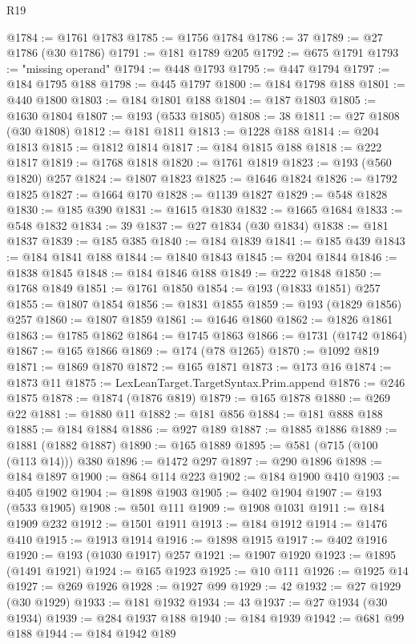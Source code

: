 \begin{lexlean}{R19}
\begin{coremodule}
@1784 := @1761 @1783
@1785 := @1756 @1784
@1786 := 37
@1789 := @27 @1786 (@30 @1786)
@1791 := @181 @1789 @205
@1792 := @675 @1791
@1793 := "missing operand"
@1794 := @448 @1793
@1795 := @447 @1794
@1797 := @184 @1795 @188
@1798 := @445 @1797
@1800 := @184 @1798 @188
@1801 := @440 @1800
@1803 := @184 @1801 @188
@1804 := @187 @1803
@1805 := @1630 @1804
@1807 := @193 (@533 @1805)
@1808 := 38
@1811 := @27 @1808 (@30 @1808)
@1812 := @181 @1811
@1813 := @1228 @188
@1814 := @204 @1813
@1815 := @1812 @1814
@1817 := @184 @1815 @188
@1818 := @222 @1817
@1819 := @1768 @1818
@1820 := @1761 @1819
@1823 := @193 (@560 @1820) @257
@1824 := @1807 @1823
@1825 := @1646 @1824
@1826 := @1792 @1825
@1827 := @1664 @170
@1828 := @1139 @1827
@1829 := @548 @1828
@1830 := @185 @390
@1831 := @1615 @1830
@1832 := @1665 @1684
@1833 := @548 @1832
@1834 := 39
@1837 := @27 @1834 (@30 @1834)
@1838 := @181 @1837
@1839 := @185 @385
@1840 := @184 @1839
@1841 := @185 @439
@1843 := @184 @1841 @188
@1844 := @1840 @1843
@1845 := @204 @1844
@1846 := @1838 @1845
@1848 := @184 @1846 @188
@1849 := @222 @1848
@1850 := @1768 @1849
@1851 := @1761 @1850
@1854 := @193 (@1833 @1851) @257
@1855 := @1807 @1854
@1856 := @1831 @1855
@1859 := @193 (@1829 @1856) @257
@1860 := @1807 @1859
@1861 := @1646 @1860
@1862 := @1826 @1861
@1863 := @1785 @1862
@1864 := @1745 @1863
@1866 := @1731 (@1742 @1864)
@1867 := @165 @1866
@1869 := @174 (@78 @1265)
@1870 := @1092 @819
@1871 := @1869 @1870
@1872 := @165 @1871
@1873 := @173 @16
@1874 := @1873 @11
@1875 := LexLeanTarget.TargetSyntax.Prim.append
@1876 := @246 @1875
@1878 := @1874 (@1876 @819)
@1879 := @165 @1878
@1880 := @269 @22
@1881 := @1880 @11
@1882 := @181 @856
@1884 := @181 @888 @188
@1885 := @184 @1884
@1886 := @927 @189
@1887 := @1885 @1886
@1889 := @1881 (@1882 @1887)
@1890 := @165 @1889
@1895 := @581 (@715 (@100 (@113 @14))) @380
@1896 := @1472 @297
@1897 := @290 @1896
@1898 := @184 @1897
@1900 := @864 @114 @223
@1902 := @184 @1900 @410
@1903 := @405 @1902
@1904 := @1898 @1903
@1905 := @402 @1904
@1907 := @193 (@533 @1905)
@1908 := @501 @111
@1909 := @1908 @1031
@1911 := @184 @1909 @232
@1912 := @1501 @1911
@1913 := @184 @1912
@1914 := @1476 @410
@1915 := @1913 @1914
@1916 := @1898 @1915
@1917 := @402 @1916
@1920 := @193 (@1030 @1917) @257
@1921 := @1907 @1920
@1923 := @1895 (@1491 @1921)
@1924 := @165 @1923
@1925 := @10 @111
@1926 := @1925 @14
@1927 := @269 @1926
@1928 := @1927 @99
@1929 := 42
@1932 := @27 @1929 (@30 @1929)
@1933 := @181 @1932
@1934 := 43
@1937 := @27 @1934 (@30 @1934)
@1939 := @284 @1937 @188
@1940 := @184 @1939
@1942 := @681 @99 @188
@1944 := @184 @1942 @189

\end{coremodule}
\end{lexlean}
